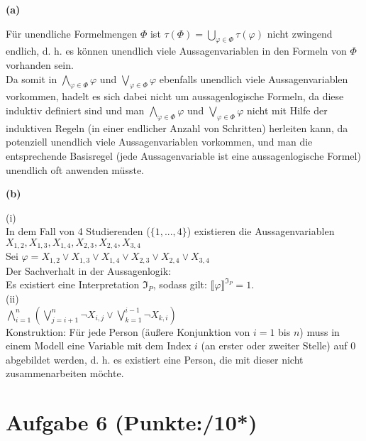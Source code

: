 \documentclass[11pt, a4paper]{article}
\newcommand{\pppp}{10*}
\newcommand{\interpretation}[1] {\mathfrak{#1}}
\begin{document}
\textbf{(a)}
\begin{adjustwidth}{20pt}{20pt}
Für unendliche Formelmengen $\Phi$ ist $\tau(\Phi)=\bigcup\limits_{\varphi \in \Phi} \tau(\varphi)$ nicht zwingend endlich, d. h. es können unendlich viele Aussagenvariablen in den Formeln von $\Phi$ vorhanden sein.\\

Da somit in $\bigwedge\limits_{\varphi \in \Phi} \varphi$ und $\bigvee\limits_{\varphi \in \Phi} \varphi$ ebenfalls unendlich viele Aussagenvariablen vorkommen, hadelt es sich dabei nicht um aussagenlogische Formeln, da diese induktiv definiert sind und man $\bigwedge\limits_{\varphi \in \Phi} \varphi$ und $\bigvee\limits_{\varphi \in \Phi} \varphi$ nicht mit Hilfe der induktiven Regeln (in einer endlicher Anzahl von Schritten) herleiten kann, da potenziell unendlich viele Aussagenvariablen vorkommen, und man die entsprechende Basisregel (jede Aussagenvariable ist eine aussagenlogische Formel) unendlich oft anwenden müsste.

\end{adjustwidth}
\textbf{(b)}
\begin{adjustwidth}{20pt}{20pt}
(i)\\
In dem Fall von 4 Studierenden ($\{1,...,4\}$) existieren die Aussagenvariablen $X_{1,2},X_{1,3},X_{1,4},X_{2,3},X_{2,4},X_{3,4}$\\
Sei $\varphi=X_{1,2} \vee X_{1,3} \vee X_{1,4} \vee X_{2,3} \vee X_{2,4} \vee X_{3,4}$\\
Der Sachverhalt in der Aussagenlogik:\\
Es existiert eine Interpretation $\interpretation{I}_P$, sodass gilt: $\llbracket \varphi \rrbracket^{\interpretation{I}_P}=1$.\\
(ii)\\

 $\bigwedge\limits_{i=1}^n \left(\bigvee\limits_{j=i+1}^n \neg X_{i,j} \vee \bigvee\limits_{k=1}^{i-1} \neg X_{k,i} \right)$\\
 
 Konstruktion: Für jede Person (äußere Konjunktion von $i=1$ bis $n$) muss in einem Modell eine Variable mit dem Index $i$ (an erster oder zweiter Stelle) auf $0$ abgebildet werden, d. h. es existiert eine Person, die mit dieser nicht zusammenarbeiten möchte.
\end{adjustwidth}

\section*{Aufgabe 6 (Punkte:\qquad/\pppp)}
\end{document}
